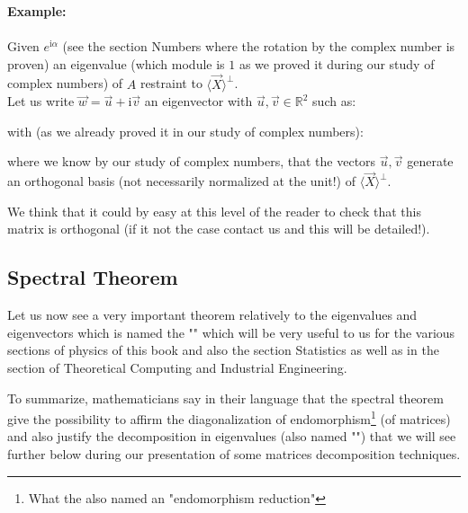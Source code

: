	\begin{tcolorbox}[colframe=black,colback=white,sharp corners]
	\textbf{{\Large {}}Example:}\\\\
	Given $e^{\mathrm{i}\alpha}$ (see the section Numbers where the rotation by the complex number is proven) an eigenvalue (which module is $1$ as we proved it during our study of complex numbers) of $A$ restraint to $\langle \vec{X} \rangle^\perp$.\\
	
	Let us write $\vec{w}=\vec{u}+\mathrm{i}\vec{v}$ an eigenvector with $\vec{u},\vec{v}\in \mathbb{R}^2$ such as:
	
	with (as we already proved it in our study of complex numbers):
	
	where we know by our study of complex numbers, that the vectors $\vec{u},\vec{v}$ generate an orthogonal basis (not necessarily normalized at the unit!) of $\langle \vec{X} \rangle^\perp$.
	\begin{tcolorbox}[title=Remark,colframe=black,arc=10pt]
	We think that it could by easy at this level of the reader to check that this matrix is orthogonal (if it not the case contact us and this will be detailed!).
	\end{tcolorbox}
	\end{tcolorbox}
	
	\pagebreak
	\subsection{Spectral Theorem}\label{spectral theorem}
	Let us now see a very important theorem relatively to the eigenvalues and eigenvectors which is named the "" which will be very useful to us for the various sections of physics of this book and also the section  Statistics as well as in the section of Theoretical Computing and Industrial Engineering.
	
	To summarize, mathematicians say in their language that the spectral theorem give the possibility to affirm the diagonalization  of endomorphism\footnote{What the also named an "endomorphism reduction"} (of matrices) and also justify the decomposition in eigenvalues (also named "") that we will see further below during our presentation of some matrices decomposition techniques.
	
